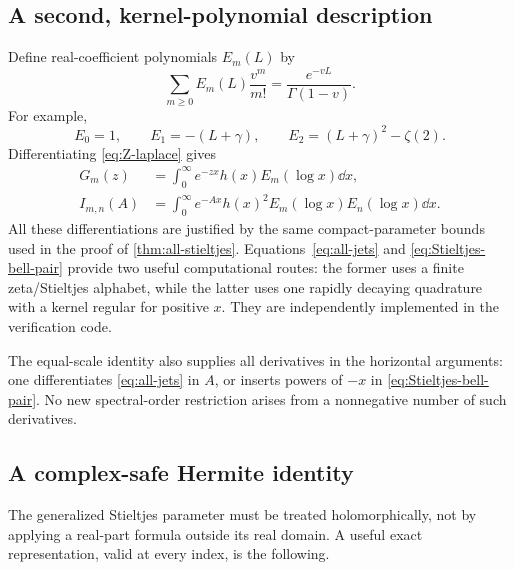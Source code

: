 \subsection{A second, kernel-polynomial description}
Define real-coefficient polynomials $E_m(L)$ by
\begin{equation}\label{eq:E-generating}
 \sum_{m\ge0}E_m(L)\frac{v^m}{m!}
          =\frac{e^{-vL}}{\Gamma(1-v)}.
\end{equation}
For example,
\[
 E_0=1,\qquad E_1=-(L+\gamma),\qquad
 E_2=(L+\gamma)^2-\zeta(2).
\]
Differentiating \eqref{eq:Z-laplace} gives
\begin{align}
 G_m(z)&=\int_0^\infty e^{-zx}h(x)E_m(\log x)\dd x,
               \label{eq:G-bell-laplace}\\
 I_{m,n}(A)&=\int_0^\infty e^{-Ax}h(x)^2
                  E_m(\log x)E_n(\log x)\dd x.
               \label{eq:Stieltjes-bell-pair}
\end{align}
All these differentiations are justified by the same compact-parameter
bounds used in the proof of \cref{thm:all-stieltjes}.
Equations~\eqref{eq:all-jets} and \eqref{eq:Stieltjes-bell-pair} provide two
useful computational routes: the former uses a finite zeta/Stieltjes
alphabet, while the latter uses one rapidly decaying quadrature with a kernel regular for positive $x$. They are independently implemented in the verification code.

The equal-scale identity also supplies all derivatives in the horizontal
arguments: one differentiates \eqref{eq:all-jets} in $A$, or inserts powers
of $-x$ in \eqref{eq:Stieltjes-bell-pair}. No new spectral-order restriction
arises from a nonnegative number of such derivatives.

\subsection{A complex-safe Hermite identity}
The generalized Stieltjes parameter must be treated holomorphically, not by
applying a real-part formula outside its real domain. A useful exact
representation, valid at every index, is the following.

